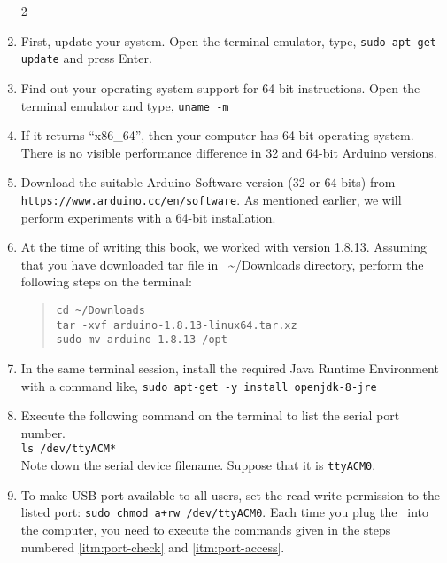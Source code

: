 \begin{enumerate}
      \setcounter{enumi}2
      \item First, update your system. Open the terminal emulator, type, 
      {\tt sudo apt-get update} and press Enter. 
      \item Find out your operating system support for 64 bit
            instructions. Open the terminal emulator and type, {\tt uname -m}
      \item If it returns ``x86\_64'', then your computer has 64-bit
            operating system.   There is no visible performance difference in 32
            and 64-bit Arduino versions.
      \item Download the suitable Arduino Software version (32 or 64 bits)
            from \\ {\tt https://www.arduino.cc/en/software}.  As mentioned
            earlier, we will perform experiments with a 64-bit installation.
            
      \item At the time of writing this book, we worked with version 1.8.13.
            Assuming that you have downloaded tar file in~
            {\large \textasciitilde}/Downloads directory, perform the following
            steps on the terminal:
            \begin{quote}
                  {\tt cd {\large\textasciitilde}/Downloads\\
                  tar -xvf arduino-1.8.13-linux64.tar.xz\\
                        sudo mv arduino-1.8.13 /opt}
            \end{quote}
            
      \item In the same terminal session, install the required Java Runtime
            Environment with a command like,
            {\tt sudo apt-get -y install openjdk-8-jre}
            
      \item \label{itm:port-check} Execute the
            following command on the terminal to list the serial port number.\\
            {\tt ls /dev/ttyACM*}\\
            Note down the serial device filename.  Suppose that it
            is {\tt ttyACM0}.
      \item \label{itm:port-access} To make USB port available to all users, set the read write
            permission to the listed port:
            {\tt sudo chmod a+rw /dev/ttyACM0}. Each time you plug the \arduino\
            into the computer, you need to execute the commands given in the steps 
            numbered \ref{itm:port-check} and \ref{itm:port-access}. 
            

\end{enumerate}
